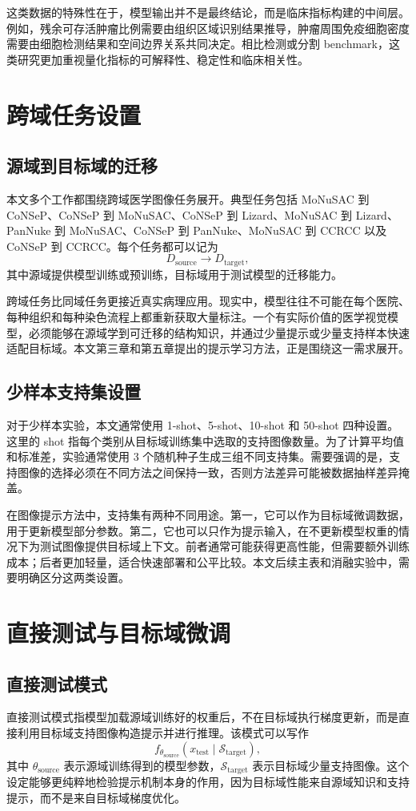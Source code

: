 这类数据的特殊性在于，模型输出并不是最终结论，而是临床指标构建的中间层。例如，残余可存活肿瘤比例需要由组织区域识别结果推导，肿瘤周围免疫细胞密度需要由细胞检测结果和空间边界关系共同决定。相比检测或分割 benchmark，这类研究更加重视量化指标的可解释性、稳定性和临床相关性。

\section{跨域任务设置}
\subsection{源域到目标域的迁移}
本文多个工作都围绕跨域医学图像任务展开。典型任务包括 MoNuSAC 到 CoNSeP、CoNSeP 到 MoNuSAC、CoNSeP 到 Lizard、MoNuSAC 到 Lizard、PanNuke 到 MoNuSAC、CoNSeP 到 PanNuke、MoNuSAC 到 CCRCC 以及 CoNSeP 到 CCRCC。每个任务都可以记为
\[
D_{\text{source}} \rightarrow D_{\text{target}},
\]
其中源域提供模型训练或预训练，目标域用于测试模型的迁移能力。

跨域任务比同域任务更接近真实病理应用。现实中，模型往往不可能在每个医院、每种组织和每种染色流程上都重新获取大量标注。一个有实际价值的医学视觉模型，必须能够在源域学到可迁移的结构知识，并通过少量提示或少量支持样本快速适配目标域。本文第三章和第五章提出的提示学习方法，正是围绕这一需求展开。

\subsection{少样本支持集设置}
对于少样本实验，本文通常使用 1-shot、5-shot、10-shot 和 50-shot 四种设置。这里的 shot 指每个类别从目标域训练集中选取的支持图像数量。为了计算平均值和标准差，实验通常使用 3 个随机种子生成三组不同支持集。需要强调的是，支持图像的选择必须在不同方法之间保持一致，否则方法差异可能被数据抽样差异掩盖。

在图像提示方法中，支持集有两种不同用途。第一，它可以作为目标域微调数据，用于更新模型部分参数。第二，它也可以只作为提示输入，在不更新模型权重的情况下为测试图像提供目标域上下文。前者通常可能获得更高性能，但需要额外训练成本；后者更加轻量，适合快速部署和公平比较。本文后续主表和消融实验中，需要明确区分这两类设置。

\section{直接测试与目标域微调}
\subsection{直接测试模式}
直接测试模式指模型加载源域训练好的权重后，不在目标域执行梯度更新，而是直接利用目标域支持图像构造提示并进行推理。该模式可以写作
\[
f_{\theta_{\text{source}}}(x_{\text{test}} \mid \mathcal{S}_{\text{target}}),
\]
其中 $\theta_{\text{source}}$ 表示源域训练得到的模型参数，$\mathcal{S}_{\text{target}}$ 表示目标域少量支持图像。这个设定能够更纯粹地检验提示机制本身的作用，因为目标域性能来自源域知识和支持提示，而不是来自目标域梯度优化。

